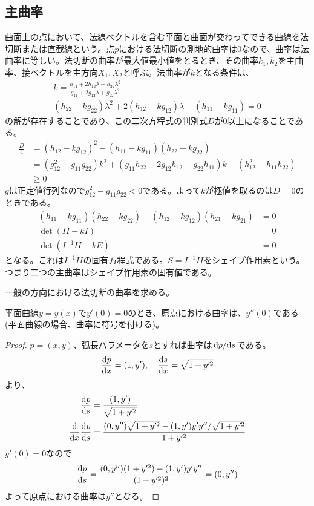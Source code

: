\subsection{主曲率}
    曲面上の点において、法線ベクトルを含む平面と曲面が交わってできる曲線を法切断または直截線という。点$p$における法切断の測地的曲率は0なので、曲率は法曲率に等しい。法切断の曲率が最大値最小値をとるとき、その曲率$k_1,k_2$を主曲率、接ベクトルを主方向$X_1,X_2$と呼ぶ。法曲率が$k$となる条件は、
    \begin{gather*}
        k = \frac{h_{11} + 2h_{12}\lambda + h_{22}\lambda^2}{g_{11} + 2g_{12}\lambda + g_{22}\lambda^2}\\
        (h_{22} - kg_{22})\lambda^2 + 2(h_{12} - kg_{12})\lambda + (h_{11} - kg_{11}) = 0
    \end{gather*}
    の解が存在することであり、この二次方程式の判別式$D$が0以上になることである。
    \begin{align*}
        \frac{D}{4}
            &= (h_{12} - kg_{12})^2 - (h_{11} - kg_{11})(h_{22} - kg_{22})\\
            &= (g_{12}^2 - g_{11}g_{22})k^2 + (g_{11}h_{22} - 2g_{12}h_{12} + g_{22}h_{11})k + (h_{12}^2 - h_{11}h_{22})\\
            &\geq 0
    \end{align*}
    $g$は正定値行列なので$g_{12}^2 - g_{11}g_{22} < 0$である。よって$k$が極値を取るのは$D = 0$のときである。
    \begin{align*}
        (h_{11} - kg_{11})(h_{22} - kg_{22}) - (h_{12} - kg_{12})(h_{21} - kg_{21}) &= 0\\
        \det(II - kI) &= 0\\
        \det(I^{-1}II - kE) &= 0
    \end{align*}
    となる。これは$I^{-1}II$の固有方程式である。$S = I^{-1}II$をシェイプ作用素という。つまり二つの主曲率はシェイプ作用素の固有値である。

    一般の方向における法切断の曲率を求める。
    \begin{lem}
        平面曲線$y = y(x)$で$y'(0) = 0$のとき、原点における曲率は、$y''(0)$である(平面曲線の場合、曲率に符号を付ける)。
    \end{lem}
    \begin{proof}
        $p = (x, y)$、弧長パラメータを$s$とすれば曲率は$\dv*{p}{s}$である。
            \[\dv{p}{x} = (1, y'), \quad \dv{s}{x} = \sqrt{1 + y'^2}\]
        より、
        \begin{align*}
            \dv{p}{s} &= \frac{(1, y')}{\sqrt{1 + y'^2}}\\
            \dv{x}\dv{p}{s} &= \frac{(0, y'')\sqrt{1 + y'^2} - (1, y')y'y'' / \sqrt{1 + y'^2}}{1 + y'^2}
        \end{align*}
        $y'(0) = 0$なので
            \[\dv{p}{s} = \frac{(0, y'')(1 + y'^2) - (1, y')y'y''}{(1 + y'^2)^2} = (0, y'')\]
        よって原点における曲率は$y''$となる。
    \end{proof}

